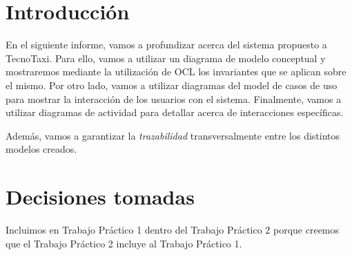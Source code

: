 \documentclass[a4paper, 10pt, twoside]{article}
\begin{document}
\newpage




\tableofcontents

\newpage




\section{Introducción}

En el siguiente informe, vamos a profundizar acerca del sistema propuesto a TecnoTaxi. Para ello, vamos a utilizar un diagrama de modelo conceptual y mostraremos mediante la utilización de OCL los invariantes que se aplican sobre el mismo. Por otro lado, vamos a utilizar diagramas del model de casos de uso para mostrar la interacción de los usuarios con el sistema. Finalmente, vamos a utilizar diagramas de actividad para detallar acerca de interacciones específicas.

Además, vamos a garantizar la \emph{trazabilidad} transversalmente entre los distintos modelos creados.



\section{Decisiones tomadas}

Incluimos en Trabajo Práctico 1 dentro del Trabajo Práctico 2 porque creemos que el Trabajo Práctico 2 incluye al Trabajo Práctico 1.

% 
\end{document}

